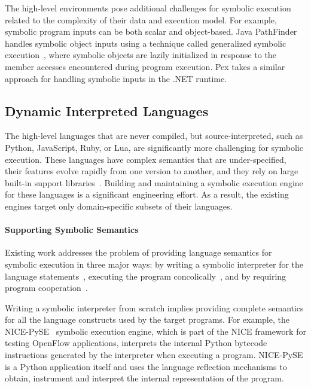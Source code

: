 The high-level environments pose additional challenges for symbolic execution related to the complexity of their data and execution model.  For example, symbolic program inputs can be both scalar and object-based.
%
Java PathFinder handles symbolic object inputs using a technique called generalized symbolic execution~\cite{generalized-symbex}, where symbolic objects are lazily initialized in response to the member accesses encountered during program execution.  Pex takes a similar approach for handling symbolic inputs in the .NET runtime.

\subsection{Dynamic Interpreted Languages}

The high-level languages that are never compiled, but source-interpreted, such as Python, JavaScript, Ruby, or Lua, are significantly more challenging for symbolic execution.
%
These languages have complex semantics that are under-specified, their features evolve rapidly from one version to another, and they rely on large built-in support libraries~\cite{dom2011,cutie-py,pythonReference}.
%
Building and maintaining a symbolic execution engine for these languages is a significant engineering effort.  As a result, the existing engines target only domain-specific subsets of their languages.

\paragraph{Supporting Symbolic Semantics}

Existing work addresses the problem of providing language semantics for symbolic execution in three major ways: by writing a symbolic interpreter for the language statements~\cite{nice}, executing the program concolically~\cite{cutie-py,jalangi}, and by requiring program cooperation~\cite{commuter}.

Writing a symbolic interpreter from scratch implies providing complete semantics for all the language constructs used by the target programs.  For example, the NICE-PySE~\cite{nice} symbolic execution engine, which is part of the NICE framework for testing OpenFlow applications, interprets the internal Python bytecode instructions generated by the interpreter when executing a program.  NICE-PySE is a Python application itself and uses the language reflection mechanisms to obtain, instrument and interpret the internal representation of the program.

